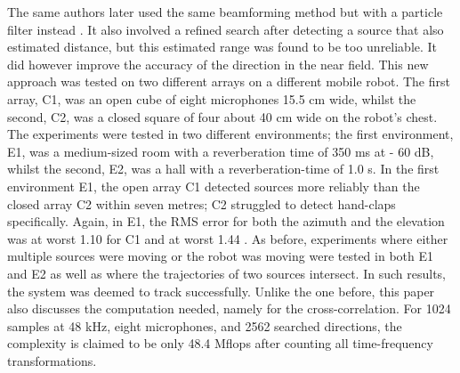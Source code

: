\documentclass{report}
\begin{document}
The same authors later used the same beamforming method but with a particle filter instead \cite{valin_robust_2007}. It also involved a refined search after detecting a source that also estimated distance, but this estimated range was found to be too unreliable. It did however improve the accuracy of the direction in the near field. This new approach was tested on two different arrays on a different mobile robot. The first array, C1, was an open cube of eight microphones 15.5 \si{cm} wide, whilst the second, C2, was a closed square of four about 40 \si{cm} wide on the robot's chest. The experiments were tested in two different environments; the first environment, E1, was a medium-sized room with a reverberation time of 350 \si{ms} at - 60 \si{dB}, whilst the second, E2, was a hall with a reverberation-time of 1.0 \si{s}. In the first environment E1, the open array C1 detected sources more reliably than the closed array C2 within seven metres; C2 struggled to detect hand-claps specifically. Again, in E1, the RMS error for both the azimuth and the elevation was at worst 1.10 \si{\deg} for C1 and at worst 1.44 \si{\deg}. As before, experiments where either multiple sources were moving or the robot was moving were tested in both E1 and E2 as well as where the trajectories of two sources intersect. In such results, the system was deemed to track successfully. Unlike the one before, this paper also discusses the computation needed, namely for the cross-correlation. For 1024 samples at 48 \si{kHz}, eight microphones, and 2562 searched directions, the complexity is claimed to be only 48.4 \si{Mflops} after counting all time-frequency transformations.
\end{document}
